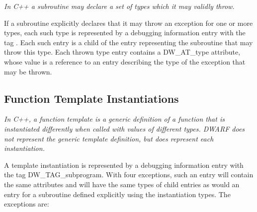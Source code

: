 \textit{In C++ a subroutine may declare a set of types which
it may validly throw.}

If a subroutine explicitly declares that it may throw
an exception for one or more types, each such type is
represented by a debugging information entry with the tag
.  
Each such entry is a child of the entry
representing the subroutine that may throw this type. Each
thrown type entry contains a DW\-\_AT\-\_type attribute, whose
value is a reference to an entry describing the type of the
exception that may be thrown.

\subsection{Function Template Instantiations}
\label{chap:functiontemplateinstantiations}

\textit{In C++, a function template is a generic definition of
a function that is instantiated differently when called with
values of different types. DWARF does not represent the generic
template definition, but does represent each instantiation.}

A template instantiation is represented by a debugging
information entry with the tag DW\_TAG\_subprogram. With four
exceptions, such an entry will contain the same attributes and
will have the same types of child entries as would an entry
for a subroutine defined explicitly using the instantiation
types. The exceptions are:

